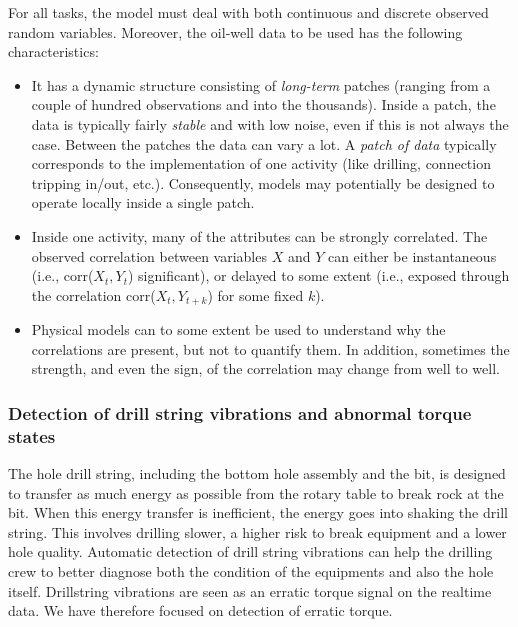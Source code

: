 For all tasks, the model must deal with both continuous and discrete observed random variables. Moreover, the oil-well data to be used has the following characteristics: 

\begin{itemize}

\item It has a dynamic structure consisting of \emph{long-term} patches (ranging from a couple of hundred observations and into the thousands). Inside a patch, the data is typically fairly \emph{stable} and with low noise, even if this is not always the case. Between the patches the data can vary a lot. A \emph{patch of data} typically corresponds to the implementation of one activity (like drilling, connection tripping in/out, etc.). 
Consequently, models may potentially be designed to operate locally inside a single patch.

\item Inside one activity, many of the attributes can be strongly correlated. The observed correlation between variables $X$ and $Y$ can either be instantaneous (i.e., corr($X_t, Y_t$) significant), or delayed to some extent (i.e., exposed through the correlation corr($X_t, Y_{t+k}$) for some fixed $k$).

\item Physical models can to some extent be used to understand why the correlations are present, but not to quantify them. In addition, sometimes the strength, and even the sign, of the correlation may change from well to well.

\end{itemize}



\subsubsection{Detection of drill string vibrations and abnormal torque states}\label{SubSection:DetectionTorque}

The hole drill string, including the bottom hole assembly and the bit, is designed to transfer as much energy as possible from the rotary table to break rock at the bit.  When this energy transfer is inefficient, the energy goes into shaking the drill string.  This involves drilling slower, a higher risk to break equipment and a lower hole quality. Automatic detection of drill string vibrations can help the drilling crew to better diagnose both the condition of the equipments and also the hole itself.  Drillstring vibrations are seen as an erratic torque signal on the realtime data.  We have therefore focused on detection of erratic torque.

